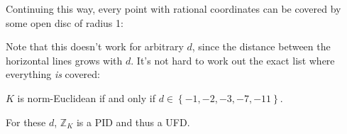 \begin{example}[?]
Continuing this way, every point with rational coordinates can be
covered by some open disc of radius 1:

\begin{figure}
\centering
{}
\end{figure}

\end{example}

\begin{remark}

Note that this doesn't work for arbitrary \(d\), since the distance
between the horizontal lines grows with \(d\). It's not hard to work out
the exact list where everything \emph{is} covered:

\end{remark}

\begin{theorem}[?]

\(K\) is norm-Euclidean if and only if
\(d\in \left\{{-1,-2,-3,-7,-11}\right\}\).

\end{theorem}

\begin{corollary}[?]

For these \(d\), \({\mathbb{Z}}_K\) is a PID and thus a UFD.

\end{corollary}

